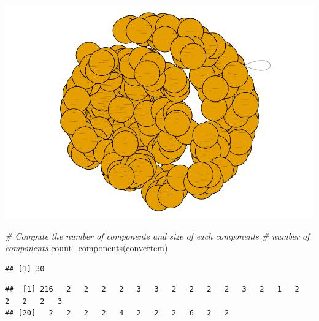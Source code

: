 \documentclass[
]{article}
\newenvironment{Shaded}{\begin{snugshade}}{\end{snugshade}}
\newcommand{\CommentTok}[1]{\textcolor[rgb]{0.56,0.35,0.01}{\textit{#1}}}
\newcommand{\FunctionTok}[1]{\textcolor[rgb]{0.00,0.00,0.00}{#1}}
\newcommand{\NormalTok}[1]{#1}
\newcommand{\OtherTok}[1]{\textcolor[rgb]{0.56,0.35,0.01}{#1}}
\newcommand{\SpecialCharTok}[1]{\textcolor[rgb]{0.00,0.00,0.00}{#1}}
\begin{document}
\includegraphics{SMI-Project-2022_files/figure-latex/unnamed-chunk-3-2.pdf}

\begin{Shaded}
\begin{Highlighting}[]
\CommentTok{\# Compute the number of components and size of each components}
\CommentTok{\# number of components}
\FunctionTok{count\_components}\NormalTok{(convertem)}
\end{Highlighting}
\end{Shaded}

\begin{verbatim}
## [1] 30
\end{verbatim}

\begin{Shaded}
\end{Shaded}

\begin{verbatim}
##  [1] 216   2   2   2   2   3   3   2   2   2   2   3   2   1   2   2   2   2   3
## [20]   2   2   2   2   4   2   2   2   6   2   2
\end{verbatim}
\end{document}
